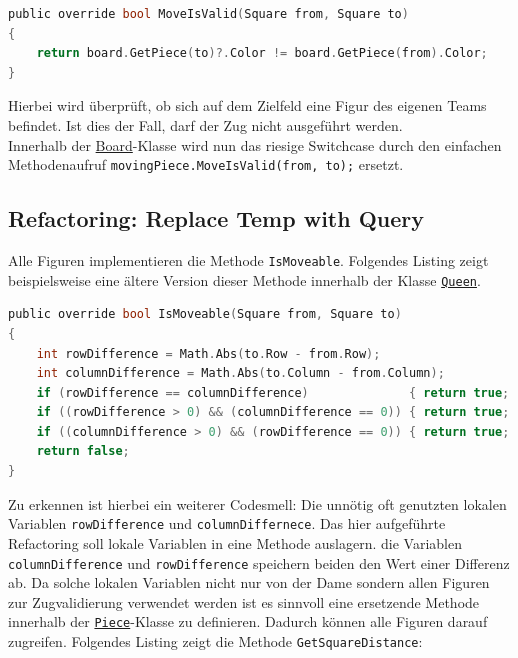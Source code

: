 \documentclass[
10pt, %
a4paper, %
oneside, %
headinclude,footinclude, %
BCOR5mm, %
]{scrartcl}
\begin{document}
\begin{onehalfspace}
\begin{lstlisting}[language=c, style=mStyle]
public override bool MoveIsValid(Square from, Square to)
{
	return board.GetPiece(to)?.Color != board.GetPiece(from).Color;
}
\end{lstlisting}

Hierbei wird überprüft, ob sich auf dem Zielfeld eine Figur des eigenen Teams befindet. Ist dies der Fall, darf der Zug nicht ausgeführt werden.\\
Innerhalb der \href{https://github.com/schmida736/Chess-AdvancedSE/blob/main/Chess-AdvancedSE/Game\%20Elements/Board.cs}{Board}-Klasse wird nun das riesige Switchcase durch den einfachen Methodenaufruf \texttt{movingPiece.MoveIsValid(from, to);} ersetzt.

\subsection{Refactoring: Replace Temp with Query}
\label{sec:replTemp}
Alle Figuren implementieren die Methode \texttt{IsMoveable}. Folgendes Listing zeigt beispielsweise eine ältere Version dieser Methode innerhalb der Klasse \texttt{\href{https://github.com/schmida736/Chess-AdvancedSE/blob/main/Chess-AdvancedSE/Game\%20Elements/Pieces/Queen.cs}{Queen}}.


\begin{lstlisting}[language=c, style=mStyle]
public override bool IsMoveable(Square from, Square to)
{
	int rowDifference = Math.Abs(to.Row - from.Row);
	int columnDifference = Math.Abs(to.Column - from.Column);
	if (rowDifference == columnDifference)              { return true; }
	if ((rowDifference > 0) && (columnDifference == 0)) { return true; }
	if ((columnDifference > 0) && (rowDifference == 0)) { return true; }
	return false;
}
\end{lstlisting}
Zu erkennen ist hierbei ein weiterer Codesmell: Die unnötig oft genutzten lokalen Variablen \texttt{rowDifference} und \texttt{columnDiffernece}. Das hier aufgeführte Refactoring soll lokale Variablen in eine Methode auslagern. die Variablen \texttt{columnDifference} und \texttt{rowDifference} speichern beiden den Wert einer Differenz ab. Da solche lokalen Variablen nicht nur von der Dame sondern allen Figuren zur Zugvalidierung verwendet werden ist es sinnvoll eine ersetzende Methode innerhalb der \texttt{\href{https://github.com/schmida736/Chess-AdvancedSE/blob/main/Chess-AdvancedSE/Game\%20Elements/Pieces/Piece.cs}{Piece}}-Klasse zu definieren. Dadurch können alle Figuren darauf zugreifen. Folgendes Listing zeigt die Methode \texttt{GetSquareDistance}:


\end{onehalfspace}
\end{document}

